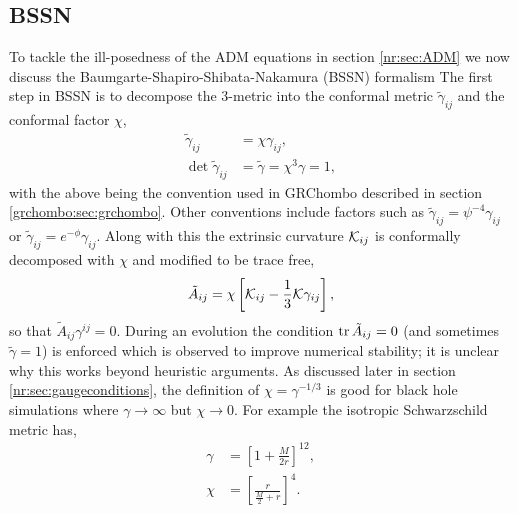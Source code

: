 \subsection{BSSN} \label{nr:sec:bssn}
To tackle the ill-posedness of the ADM equations in section \ref{nr:sec:ADM} we now discuss the Baumgarte-Shapiro-Shibata-Nakamura (BSSN) formalism \cite{Baumgarte:1998te} The first step in BSSN is to decompose the 3-metric into the conformal metric $\tilde{\gamma}_{ij}$ and the conformal factor $\chi$,
\begin{align} 
\tilde{\gamma}_{ij} &= \chi \gamma_{ij},\\
 \det{\tilde{\gamma}_{ij}} &= \tilde{\gamma} = \chi^3\gamma = 1,
\end{align}
with the above being the convention used in {\sc GRChombo} described in section \ref{grchombo:sec:grchombo}. Other conventions include factors such as
$\tilde{\gamma}_{ij} = \psi^{-4}\gamma_{ij}$ or $\tilde{\gamma}_{ij} =e^{-\phi}\gamma_{ij}$.
Along with this the extrinsic curvature $\mathcal{K}_{ij}$ is conformally decomposed with $\chi$ and modified to be trace free,
\begin{equation} \tilde{A}_{ij} = \chi\left[ \mathcal{K}_{ij}-\frac{1}{3}\mathcal{K}\gamma_{ij}\right], \end{equation} so that $\tilde{A}_{ij}\gamma^{ij}=0$.
During an evolution the condition $\trace{\tilde{A}_{ij}=0}$ (and sometimes $\tilde{\gamma}=1$) is enforced which is observed to improve numerical stability; it is unclear why this works beyond heuristic arguments. As discussed later in section \ref{nr:sec:gaugeconditions}, the definition of $\chi = \gamma^{-1/3}$ is good for black hole simulations where $\gamma\rightarrow\infty$ but $\chi \rightarrow 0$. For example the isotropic Schwarzschild metric has, 
\begin{align}
\gamma &= \left[ 1+ \frac{M}{2r}\right]^{12},\\
\chi &=\left[ \frac{r}{\frac{M}{2} + r}\right]^4.
\end{align} 

